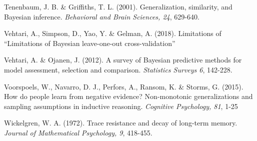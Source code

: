 \documentclass[doc]{apa6}
\theoremstyle{definition}
\theoremstyle{definition}
\theoremstyle{definition}
\theoremstyle{remark}
\begin{document}
Tenenbaum, J. B. \& Griffiths, T. L. (2001). Generalization, similarity,
and Bayesian inference. \emph{Behavioral and Brain Sciences, 24},
629-640.

Vehtari, A., Simpson, D., Yao, Y. \& Gelman, A. (2018). Limitations of
\enquote{Limitations of Bayesian leave-one-out cross-validation}

Vehtari, A. \& Ojanen, J. (2012). A survey of Bayesian predictive
methods for model assessment, selection and comparison. \emph{Statistics
Surveys 6}, 142-228.

Voorspoels, W., Navarro, D. J., Perfors, A., Ransom, K. \& Storms, G.
(2015). How do people learn from negative evidence? Non-monotonic
generalizations and sampling assumptions in inductive reasoning.
\emph{Cognitive Psychology, 81}, 1-25

Wickelgren, W. A. (1972). Trace resistance and decay of long-term
memory. \emph{Journal of Mathematical Psychology, 9}, 418-455.

\endgroup
\end{document}
